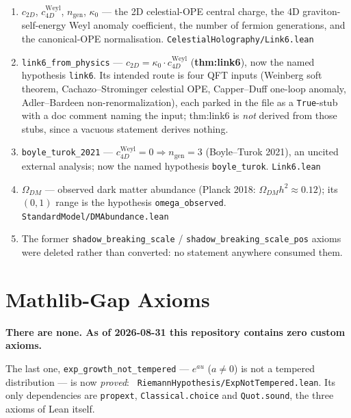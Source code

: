 \documentclass{report}
\theoremstyle{definition}
\begin{document}
\begin{itemize}
\begin{itemize}
\begin{enumerate}
  \item $c_{2D}$, $c_{4D}^{\mathrm{Weyl}}$, $n_{\mathrm{gen}}$, $\kappa_0$ --- the 2D
        celestial-OPE central charge, the 4D graviton-self-energy Weyl anomaly coefficient,
        the number of fermion generations, and the canonical-OPE normalisation.
        \hfill \texttt{CelestialHolography/Link6.lean}
  \item \texttt{link6\_from\_physics} --- $c_{2D} = \kappa_0 \cdot c_{4D}^{\mathrm{Weyl}}$
        (\textbf{thm:link6}), now the named hypothesis \texttt{link6}. Its intended route is
        four QFT inputs (Weinberg soft theorem, Cachazo--Strominger celestial OPE,
        Capper--Duff one-loop anomaly, Adler--Bardeen non-renormalization), each parked in
        the file as a \texttt{True}-stub with a doc comment naming the input; thm:link6 is
        \emph{not} derived from those stubs, since a vacuous statement derives nothing.
  \item \texttt{boyle\_turok\_2021} --- $c_{4D}^{\mathrm{Weyl}}=0 \Rightarrow
        n_{\mathrm{gen}}=3$ (Boyle--Turok 2021), an uncited external analysis; now the named
        hypothesis \texttt{boyle\_turok}. \hfill \texttt{Link6.lean}
  \item $\Omega_{DM}$ --- observed dark matter abundance (Planck 2018:
        $\Omega_{DM}h^2 \approx 0.12$); its $(0,1)$ range is the hypothesis
        \texttt{omega\_observed}. \hfill \texttt{StandardModel/DMAbundance.lean}
  \item The former \texttt{shadow\_breaking\_scale} / \texttt{shadow\_breaking\_scale\_pos}
        axioms were deleted rather than converted: no statement anywhere consumed them.
\end{enumerate}

\section{Mathlib-Gap Axioms}

\textbf{There are none. As of 2026-08-31 this repository contains zero custom axioms.}

The last one, \texttt{exp\_growth\_not\_tempered} --- $e^{au}$ ($a\neq0$) is not a tempered
distribution --- is now \emph{proved}:
\leanok\
\texttt{RiemannHypothesis/ExpNotTempered.lean}. Its only dependencies are
\texttt{propext}, \texttt{Classical.choice} and \texttt{Quot.sound}, the three axioms of
Lean itself.


\end{itemize}
\end{itemize}
\end{document}
